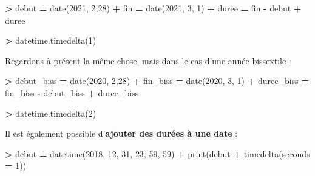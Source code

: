 \documentclass[12pt,]{book}
\newenvironment{Shaded}{\begin{snugshade}}{\end{snugshade}}
\newcommand{\DecValTok}[1]{\textcolor[rgb]{0.00,0.00,0.81}{#1}}
\newcommand{\OperatorTok}[1]{\textcolor[rgb]{0.81,0.36,0.00}{\textbf{#1}}}
\newcommand{\BuiltInTok}[1]{#1}
\newcommand{\NormalTok}[1]{#1}
\numberwithin{equation}{section}
\numberwithin{countremarque}{section}
\begin{document}
\begin{Shaded}
\begin{Highlighting}[]
\OperatorTok{>}\NormalTok{ debut }\OperatorTok{=}\NormalTok{ date(}\DecValTok{2021}\NormalTok{, }\DecValTok{2}\NormalTok{,}\DecValTok{28}\NormalTok{)}
\OperatorTok{+}\NormalTok{ fin }\OperatorTok{=}\NormalTok{ date(}\DecValTok{2021}\NormalTok{, }\DecValTok{3}\NormalTok{, }\DecValTok{1}\NormalTok{)}
\OperatorTok{+}\NormalTok{ duree }\OperatorTok{=}\NormalTok{ fin }\OperatorTok{-}\NormalTok{ debut}
\OperatorTok{+}\NormalTok{ duree}
\end{Highlighting}
\end{Shaded}

\begin{Shaded}
\begin{Highlighting}[]
\OperatorTok{>}\NormalTok{ datetime.timedelta(}\DecValTok{1}\NormalTok{)}
\end{Highlighting}
\end{Shaded}

Regardons à présent la même chose, mais dans le cas d'une année
bissextile :

\begin{Shaded}
\begin{Highlighting}[]
\OperatorTok{>}\NormalTok{ debut_biss }\OperatorTok{=}\NormalTok{ date(}\DecValTok{2020}\NormalTok{, }\DecValTok{2}\NormalTok{,}\DecValTok{28}\NormalTok{)}
\OperatorTok{+}\NormalTok{ fin_biss }\OperatorTok{=}\NormalTok{ date(}\DecValTok{2020}\NormalTok{, }\DecValTok{3}\NormalTok{, }\DecValTok{1}\NormalTok{)}
\OperatorTok{+}\NormalTok{ duree_biss }\OperatorTok{=}\NormalTok{ fin_biss }\OperatorTok{-}\NormalTok{ debut_biss}
\OperatorTok{+}\NormalTok{ duree_biss}
\end{Highlighting}
\end{Shaded}

\begin{Shaded}
\begin{Highlighting}[]
\OperatorTok{>}\NormalTok{ datetime.timedelta(}\DecValTok{2}\NormalTok{)}
\end{Highlighting}
\end{Shaded}

Il est également possible d'\textbf{ajouter des durées à une date} :

\begin{Shaded}
\begin{Highlighting}[]
\OperatorTok{>}\NormalTok{ debut }\OperatorTok{=}\NormalTok{ datetime(}\DecValTok{2018}\NormalTok{, }\DecValTok{12}\NormalTok{, }\DecValTok{31}\NormalTok{, }\DecValTok{23}\NormalTok{, }\DecValTok{59}\NormalTok{, }\DecValTok{59}\NormalTok{)}
\OperatorTok{+} \BuiltInTok{print}\NormalTok{(debut }\OperatorTok{+}\NormalTok{ timedelta(seconds }\OperatorTok{=} \DecValTok{1}\NormalTok{))}
\end{Highlighting}
\end{Shaded}
\end{document}
